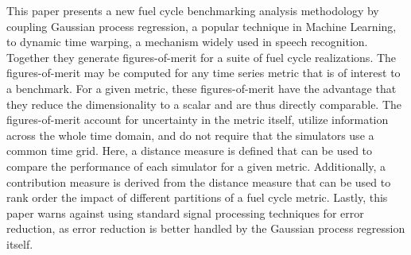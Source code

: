 This paper presents a new fuel cycle benchmarking analysis methodology
by coupling Gaussian process regression, a popular technique in Machine 
Learning, to dynamic time warping, a mechanism widely used in speech 
recognition. Together they generate figures-of-merit for a suite of fuel 
cycle realizations. The figures-of-merit may be computed for any time 
series metric that is of interest to a benchmark. For a given metric, 
these figures-of-merit have the advantage that they reduce the 
dimensionality to a scalar and are thus directly comparable. 
The figures-of-merit
account for uncertainty in the metric itself, utilize information
across the whole time domain, and do not require that the simulators
use a common time grid. Here, a distance measure is defined that can be used 
to compare the performance of each simulator for a given metric. Additionally, 
a contribution measure is derived from the distance measure that can be used 
to rank order the impact of different partitions of a fuel cycle metric. 
Lastly, this paper 
warns against using standard signal processing techniques for error reduction,
as error reduction is better handled by the Gaussian process regression 
itself.
